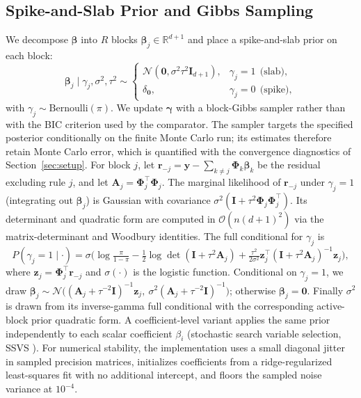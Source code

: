\documentclass[1p,times]{elsarticle}
\begin{document}
\subsection{Spike-and-Slab Prior and Gibbs Sampling}
\label{sec:gibbs}

We decompose $\boldsymbol{\beta}$ into $R$ blocks $\boldsymbol{\beta}_j\in\mathbb{R}^{d+1}$ and place a spike-and-slab prior on each block:
\begin{equation}
 \boldsymbol{\beta}_j \mid \gamma_j,\sigma^2,\tau^2 \sim
 \begin{cases}
  \mathcal{N}(\mathbf{0},\sigma^2\tau^2\mathbf{I}_{d+1}), & \gamma_j=1 \ \ \text{(slab)},\\[3pt]
  \delta_{\mathbf{0}}, & \gamma_j=0 \ \ \text{(spike)},
 \end{cases}
 \label{eq:spikeslab}
\end{equation}
with $\gamma_j\sim\mathrm{Bernoulli}(\pi)$. We update $\boldsymbol{\gamma}$ with a block-Gibbs sampler rather than with the BIC criterion used by the comparator.
The sampler targets the specified posterior conditionally on the finite Monte Carlo run; its estimates therefore retain Monte Carlo error, which is quantified with the convergence diagnostics of Section~\ref{sec:setup}.
For block $j$, let $\mathbf{r}_{-j}=\mathbf{y}-\sum_{k\neq j}\boldsymbol{\Phi}_k\boldsymbol{\beta}_k$ be the residual excluding rule $j$, and let $\mathbf{A}_j=\boldsymbol{\Phi}_j^{\top}\boldsymbol{\Phi}_j$.
The marginal likelihood of $\mathbf{r}_{-j}$ under $\gamma_j=1$ (integrating out $\boldsymbol{\beta}_j$) is Gaussian with covariance $\sigma^2(\mathbf{I}+\tau^2\boldsymbol{\Phi}_j\boldsymbol{\Phi}_j^{\top})$.
Its determinant and quadratic form are computed in $\mathcal{O}(n(d+1)^2)$ via the matrix-determinant and Woodbury identities. The full conditional for $\gamma_j$ is
\begin{equation}
 P(\gamma_j=1\mid\cdot)=\sigma\!\Big(\log\tfrac{\pi}{1-\pi}
  -\tfrac12\log\det(\mathbf{I}+\tau^2\mathbf{A}_j)
  +\tfrac{\tau^2}{2\sigma^2}\mathbf{z}_j^{\top}(\mathbf{I}+\tau^2\mathbf{A}_j)^{-1}\mathbf{z}_j\Big),
 \label{eq:gamma}
\end{equation}
where $\mathbf{z}_j=\boldsymbol{\Phi}_j^{\top}\mathbf{r}_{-j}$ and $\sigma(\cdot)$ is the logistic function.
Conditional on $\gamma_j=1$, we draw $\boldsymbol{\beta}_j\sim\mathcal{N}\big((\mathbf{A}_j+\tau^{-2}\mathbf{I})^{-1}\mathbf{z}_j,\ \sigma^2(\mathbf{A}_j+\tau^{-2}\mathbf{I})^{-1}\big)$; otherwise $\boldsymbol{\beta}_j=\mathbf{0}$.
Finally $\sigma^2$ is drawn from its inverse-gamma full conditional with the corresponding active-block prior quadratic form.
A coefficient-level variant applies the same prior independently to each scalar coefficient $\beta_i$ (stochastic search variable selection, SSVS \cite{george1993variable}).
For numerical stability, the implementation uses a small diagonal jitter in sampled precision matrices, initializes coefficients from a ridge-regularized least-squares fit with no additional intercept, and floors the sampled noise variance at $10^{-4}$.
\end{document}
